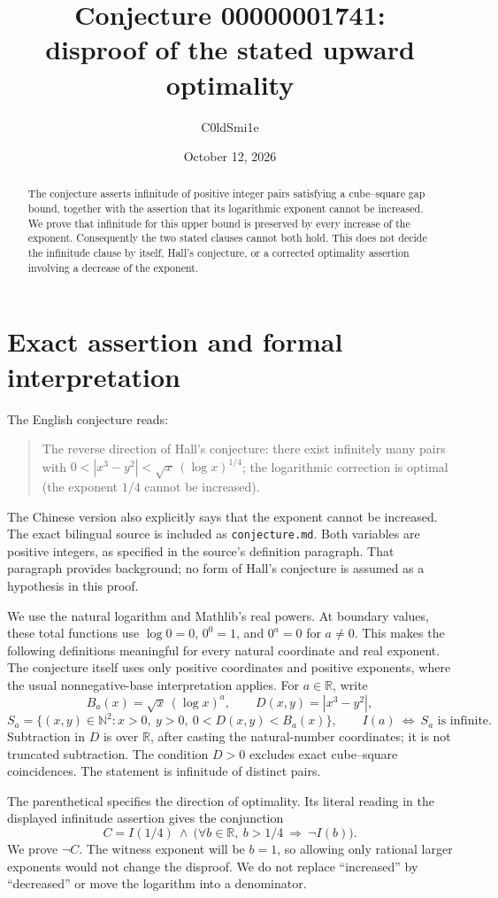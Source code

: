 \documentclass[11pt]{article}
\title{Conjecture 00000001741:\\disproof of the stated upward optimality}
\author{C0ldSmi1e}
\date{October 12, 2026}
\newcommand{\N}{\mathbb N}
\newcommand{\R}{\mathbb R}
\begin{document}
\maketitle
\begin{abstract}
The conjecture asserts infinitude of positive integer pairs satisfying a
cube--square gap bound, together with the assertion that its logarithmic
exponent cannot be increased. We prove that infinitude for this upper bound
is preserved by every increase of the exponent. Consequently the two stated
clauses cannot both hold. This does not decide the infinitude clause by itself,
Hall's conjecture, or a corrected optimality assertion involving a decrease
of the exponent.
\end{abstract}

\section{Exact assertion and formal interpretation}
The English conjecture reads:
\begin{quote}
The reverse direction of Hall's conjecture: there exist infinitely many pairs
with $0<|x^3-y^2|<\sqrt{x}\,(\log x)^{1/4}$; the logarithmic correction is optimal
(the exponent $1/4$ cannot be increased).
\end{quote}
The Chinese version also explicitly says that the exponent cannot be increased.
The exact bilingual source is included as \texttt{conjecture.md}. Both variables
are positive integers, as specified in the source's definition paragraph.
That paragraph provides background; no form of Hall's conjecture is assumed
as a hypothesis in this proof.

We use the natural logarithm and Mathlib's real powers. At boundary values,
these total functions use $\log 0=0$, $0^0=1$, and $0^a=0$ for $a\ne0$.
This makes the following definitions meaningful for every natural coordinate
and real exponent. The conjecture itself uses only positive coordinates and
positive exponents, where the usual nonnegative-base interpretation applies.
For $a\in\R$, write
\[
 B_a(x)=\sqrt{x}\,(\log x)^a,
 \qquad D(x,y)=|x^3-y^2|,
\]
\[
 S_a=\{(x,y)\in\N^2: x>0,\ y>0,\ 0<D(x,y)<B_a(x)\},
 \qquad I(a)\ \Longleftrightarrow\ S_a\text{ is infinite}.
\]
Subtraction in $D$ is over $\R$, after casting the natural-number coordinates;
it is not truncated subtraction. The condition $D>0$ excludes exact
cube--square coincidences. The statement is infinitude of distinct pairs.

The parenthetical specifies the direction of optimality. Its literal reading
in the displayed infinitude assertion gives the conjunction
\begin{equation}\label{eq:claim}
 C=I(1/4)\ \wedge\
       \bigl(\forall b\in\R,\ b>1/4\ \Longrightarrow\ \neg I(b)\bigr).
\end{equation}
We prove $\neg C$. The witness exponent will be $b=1$, so allowing only
rational larger exponents would not change the disproof. We do not replace
``increased'' by ``decreased'' or move the logarithm into a denominator.
\end{document}
